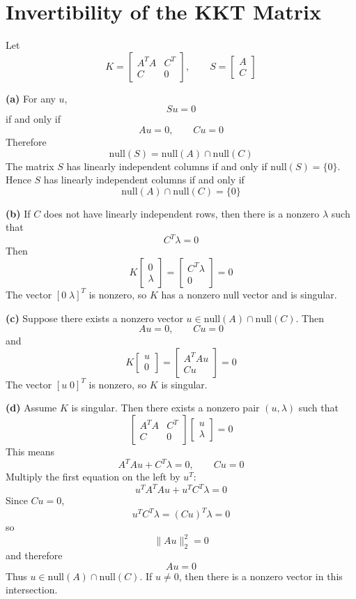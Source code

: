 \section{Invertibility of the KKT Matrix}

Let
\[
K=
\begin{bmatrix}
A^TA&C^T\\
C&0
\end{bmatrix},
\qquad
S=
\begin{bmatrix}
A\\C
\end{bmatrix}
\]

\textbf{(a)}
For any \(u\),
\[
Su=0
\]
if and only if
\[
Au=0,\qquad Cu=0
\]
Therefore
\[
\mathrm{null}(S)=\mathrm{null}(A)\cap\mathrm{null}(C)
\]
The matrix \(S\) has linearly independent columns if and only if \(\mathrm{null}(S)=\{0\}\). Hence \(S\) has linearly independent columns if and only if
\[
\mathrm{null}(A)\cap\mathrm{null}(C)=\{0\}
\]

\textbf{(b)}
If \(C\) does not have linearly independent rows, then there is a nonzero \(\lambda\) such that
\[
C^T\lambda=0
\]
Then
\[
K
\begin{bmatrix}
0\\ \lambda
\end{bmatrix}
=
\begin{bmatrix}
C^T\lambda\\0
\end{bmatrix}
=0
\]
The vector \([0\;\lambda]^T\) is nonzero, so \(K\) has a nonzero null vector and is singular.

\textbf{(c)}
Suppose there exists a nonzero vector \(u\in\mathrm{null}(A)\cap\mathrm{null}(C)\). Then
\[
Au=0,\qquad Cu=0
\]
and
\[
K
\begin{bmatrix}
u\\0
\end{bmatrix}
=
\begin{bmatrix}
A^TAu\\Cu
\end{bmatrix}
=0
\]
The vector \([u\;0]^T\) is nonzero, so \(K\) is singular.

\textbf{(d)}
Assume \(K\) is singular. Then there exists a nonzero pair \((u,\lambda)\) such that
\[
\begin{bmatrix}
A^TA&C^T\\
C&0
\end{bmatrix}
\begin{bmatrix}
u\\\lambda
\end{bmatrix}
=0
\]
This means
\[
A^TAu+C^T\lambda=0,
\qquad
Cu=0
\]
Multiply the first equation on the left by \(u^T\):
\[
u^TA^TAu+u^TC^T\lambda=0
\]
Since \(Cu=0\),
\[
u^TC^T\lambda=(Cu)^T\lambda=0
\]
so
\[
\|Au\|_2^2=0
\]
and therefore
\[
Au=0
\]
Thus \(u\in\mathrm{null}(A)\cap\mathrm{null}(C)\). If \(u\ne 0\), then there is a nonzero vector in this intersection.


